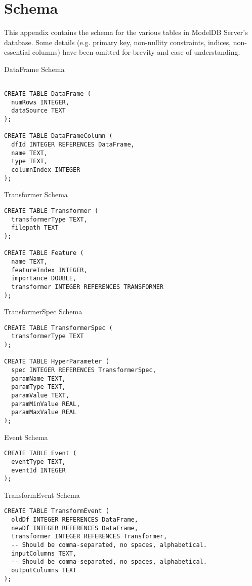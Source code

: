\chapter{Schema}
This appendix contains the schema for the various tables
in ModelDB Server's database. Some details (e.g. primary key,
non-nullity constraints, indices, non-essential columns) have
been omitted for brevity and ease of understanding.

\begin{listing}
\caption{DataFrame Schema}
\begin{verbatim}

CREATE TABLE DataFrame (
  numRows INTEGER,
  dataSource TEXT
);

CREATE TABLE DataFrameColumn (
  dfId INTEGER REFERENCES DataFrame,
  name TEXT,
  type TEXT,
  columnIndex INTEGER
);
\end{verbatim}
\label{listing:dataframe}
\end{listing}

\begin{listing}
\caption{Transformer Schema}
\begin{verbatim}
CREATE TABLE Transformer (
  transformerType TEXT,
  filepath TEXT
);

CREATE TABLE Feature (
  name TEXT,
  featureIndex INTEGER,
  importance DOUBLE,
  transformer INTEGER REFERENCES TRANSFORMER
);
\end{verbatim}
\label{listing:transformer}
\end{listing}

\begin{listing}
\caption{TransformerSpec Schema}
\begin{verbatim}
CREATE TABLE TransformerSpec (
  transformerType TEXT
);

CREATE TABLE HyperParameter (
  spec INTEGER REFERENCES TransformerSpec,
  paramName TEXT,
  paramType TEXT,
  paramValue TEXT,
  paramMinValue REAL,
  paramMaxValue REAL
);
\end{verbatim}
\label{listing:transformerspec}
\end{listing}

\begin{listing}
\caption{Event Schema}
\begin{verbatim}
CREATE TABLE Event (
  eventType TEXT,
  eventId INTEGER
);
\end{verbatim}
\label{listing:event}
\end{listing}

\begin{listing}
\caption{TransformEvent Schema}
\begin{verbatim}
CREATE TABLE TransformEvent (
  oldDf INTEGER REFERENCES DataFrame,
  newDf INTEGER REFERENCES DataFrame,
  transformer INTEGER REFERENCES Transformer,
  -- Should be comma-separated, no spaces, alphabetical.
  inputColumns TEXT, 
  -- Should be comma-separated, no spaces, alphabetical.
  outputColumns TEXT 
);
\end{verbatim}
\label{listing:transformevent}
\end{listing}

